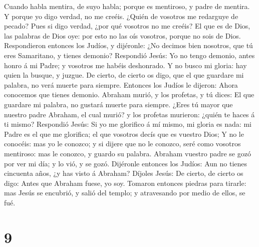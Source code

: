 Cuando habla mentira, de suyo habla; porque es mentiroso, y padre de
mentira.  Y porque yo digo verdad, no me creéis.
 ¿Quién de vosotros me redarguye de pecado? Pues si digo
verdad, ¿por qué vosotros no me creéis?  El que es de Dios,
las palabras de Dios oye: por esto no las oís vosotros, porque no sois
de Dios.  Respondieron entonces los Judíos, y dijéronle:
¿No decimos bien nosotros, que tú eres Samaritano, y tienes demonio?
 Respondió Jesús: Yo no tengo demonio, antes honro á mi
Padre; y vosotros me habéis deshonrado.  Y no busco mi
gloria: hay quien la busque, y juzgue.  De cierto, de
cierto os digo, que el que guardare mi palabra, no verá muerte para
siempre.  Entonces los Judíos le dijeron: Ahora conocemos
que tienes demonio. Abraham murió, y los profetas, y tú dices: El que
guardare mi palabra, no gustará muerte para siempre.  ¿Eres
tú mayor que nuestro padre Abraham, el cual murió? y los profetas
murieron: ¿quién te haces á ti mismo?  Respondió Jesús: Si
yo me glorifico á mí mismo, mi gloria es nada: mi Padre es el que me
glorifica; el que vosotros decís que es vuestro Dios;  Y no
le conocéis: mas yo le conozco; y si dijere que no le conozco, seré como
vosotros mentiroso: mas le conozco, y guardo su palabra. 
Abraham vuestro padre se gozó por ver mi día; y lo vió, y se gozó.
 Dijéronle entonces los Judíos: Aun no tienes cincuenta
años, ¿y has visto á Abraham?  Díjoles Jesús: De cierto, de
cierto os digo: Antes que Abraham fuese, yo soy.  Tomaron
entonces piedras para tirarle: mas Jesús se encubrió, y salió del
templo; y atravesando por medio de ellos, se fué.

\hypertarget{section-8}{%
\section{9}\label{section-8}}

